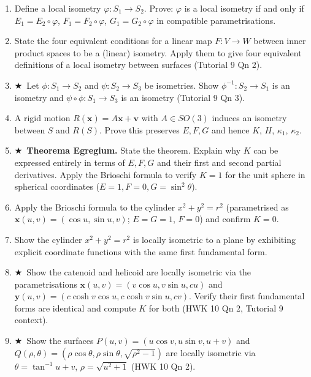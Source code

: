 \documentclass[11pt, a4paper]{article}
\newcommand{\kp}{\kappa}
\newcommand{\hard}{$\bigstar$\ }
\begin{document}
\begin{enumerate}[label=\textbf{Q\arabic*.}, leftmargin=*, itemsep=6pt]

\item Define a local isometry $\varphi:S_1\to S_2$. Prove: $\varphi$ is a local isometry if and only if $E_1=E_2\circ\varphi$, $F_1=F_2\circ\varphi$, $G_1=G_2\circ\varphi$ in compatible parametrisations.

\item State the four equivalent conditions for a linear map $F:V\to W$ between inner product spaces to be a (linear) isometry. Apply them to give four equivalent definitions of a local isometry between surfaces (Tutorial 9 Qn 2).

\item \hard Let $\phi:S_1\to S_2$ and $\psi:S_2\to S_3$ be isometries. Show $\phi^{-1}:S_2\to S_1$ is an isometry and $\psi\circ\phi:S_1\to S_3$ is an isometry (Tutorial 9 Qn 3).

\item A rigid motion $R(\mathbf{x})=A\mathbf{x}+\mathbf{v}$ with $A\in SO(3)$ induces an isometry between $S$ and $R(S)$. Prove this preserves $E,F,G$ and hence $K$, $H$, $\kp_1$, $\kp_2$.

\item \hard \textbf{Theorema Egregium.} State the theorem. Explain why $K$ can be expressed entirely in terms of $E,F,G$ and their first and second partial derivatives. Apply the Brioschi formula to verify $K=1$ for the unit sphere in spherical coordinates ($E=1,F=0,G=\sin^2\theta$).

\item Apply the Brioschi formula to the cylinder $x^2+y^2=r^2$ (parametrised as $\mathbf{x}(u,v)=(\cos u,\sin u,v)$; $E=G=1$, $F=0$) and confirm $K=0$.

\item Show the cylinder $x^2+y^2=r^2$ is locally isometric to a plane by exhibiting explicit coordinate functions with the same first fundamental form.

\item \hard Show the catenoid and helicoid are locally isometric via the parametrisations $\mathbf{x}(u,v)=(v\cos u,v\sin u,cu)$ and $\mathbf{y}(u,v)=(c\cosh v\cos u,c\cosh v\sin u,cv)$. Verify their first fundamental forms are identical and compute $K$ for both (HWK 10 Qn 2, Tutorial 9 context).

\item \hard Show the surfaces $P(u,v)=(u\cos v,u\sin v,u+v)$ and $Q(\rho,\theta)=(\rho\cos\theta,\rho\sin\theta,\sqrt{\rho^2-1})$ are locally isometric via $\theta=\tan^{-1}u+v$, $\rho=\sqrt{u^2+1}$ (HWK 10 Qn 2).


\end{enumerate}
\end{document}
